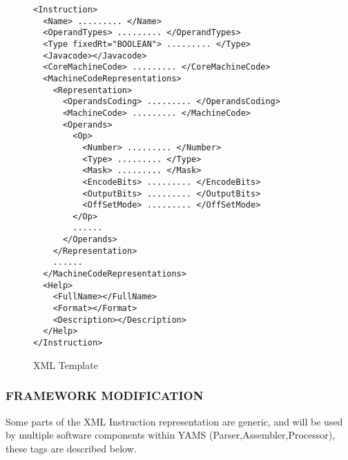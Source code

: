 \begin{figure}[]
\begin{center}
\begin{verbatim}
<Instruction>
  <Name> ......... </Name>
  <OperandTypes> ......... </OperandTypes>
  <Type fixedRt="BOOLEAN"> ......... </Type>
  <Javacode></Javacode>
  <CoreMachineCode> ......... </CoreMachineCode>
  <MachineCodeRepresentations>
    <Representation>
      <OperandsCoding> ......... </OperandsCoding>
      <MachineCode> ......... </MachineCode>
      <Operands>
        <Op>
          <Number> ......... </Number>
          <Type> ......... </Type>
          <Mask> ......... </Mask>
          <EncodeBits> ......... </EncodeBits>
          <OutputBits> ......... </OutputBits>
          <OffSetMode> ......... </OffSetMode>
        </Op>
        ......
      </Operands>
    </Representation>
    ......
  </MachineCodeRepresentations>
  <Help>
    <FullName></FullName>
    <Format></Format>
    <Description></Description>
  </Help>
</Instruction>
\end{verbatim}
\end{center}
\caption{XML Template}
\label{figXMLTemplate}
\end{figure}


\subsubsection{FRAMEWORK MODIFICATION}

Some parts of the XML Instruction representation are generic, and will be used by multiple software components within YAMS (Parser,Assembler,Processor), these tags are described below.

